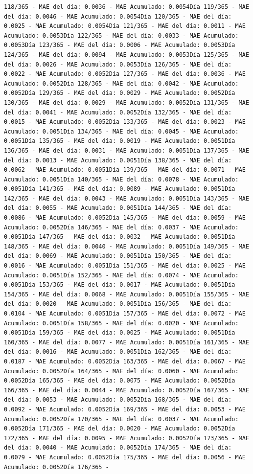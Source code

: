 \documentclass[
]{book}
\begin{document}
\begin{verbatim}
118/365 - MAE del día: 0.0036 - MAE Acumulado: 0.0054Día 119/365 - MAE del día: 0.0046 - MAE Acumulado: 0.0054Día 120/365 - MAE del día: 0.0025 - MAE Acumulado: 0.0054Día 121/365 - MAE del día: 0.0011 - MAE Acumulado: 0.0053Día 122/365 - MAE del día: 0.0033 - MAE Acumulado: 0.0053Día 123/365 - MAE del día: 0.0006 - MAE Acumulado: 0.0053Día 124/365 - MAE del día: 0.0094 - MAE Acumulado: 0.0053Día 125/365 - MAE del día: 0.0026 - MAE Acumulado: 0.0053Día 126/365 - MAE del día: 0.0022 - MAE Acumulado: 0.0052Día 127/365 - MAE del día: 0.0036 - MAE Acumulado: 0.0052Día 128/365 - MAE del día: 0.0042 - MAE Acumulado: 0.0052Día 129/365 - MAE del día: 0.0029 - MAE Acumulado: 0.0052Día 130/365 - MAE del día: 0.0029 - MAE Acumulado: 0.0052Día 131/365 - MAE del día: 0.0041 - MAE Acumulado: 0.0052Día 132/365 - MAE del día: 0.0015 - MAE Acumulado: 0.0052Día 133/365 - MAE del día: 0.0023 - MAE Acumulado: 0.0051Día 134/365 - MAE del día: 0.0045 - MAE Acumulado: 0.0051Día 135/365 - MAE del día: 0.0019 - MAE Acumulado: 0.0051Día 136/365 - MAE del día: 0.0031 - MAE Acumulado: 0.0051Día 137/365 - MAE del día: 0.0013 - MAE Acumulado: 0.0051Día 138/365 - MAE del día: 0.0062 - MAE Acumulado: 0.0051Día 139/365 - MAE del día: 0.0071 - MAE Acumulado: 0.0051Día 140/365 - MAE del día: 0.0078 - MAE Acumulado: 0.0051Día 141/365 - MAE del día: 0.0089 - MAE Acumulado: 0.0051Día 142/365 - MAE del día: 0.0043 - MAE Acumulado: 0.0051Día 143/365 - MAE del día: 0.0055 - MAE Acumulado: 0.0051Día 144/365 - MAE del día: 0.0086 - MAE Acumulado: 0.0052Día 145/365 - MAE del día: 0.0059 - MAE Acumulado: 0.0052Día 146/365 - MAE del día: 0.0037 - MAE Acumulado: 0.0051Día 147/365 - MAE del día: 0.0032 - MAE Acumulado: 0.0051Día 148/365 - MAE del día: 0.0040 - MAE Acumulado: 0.0051Día 149/365 - MAE del día: 0.0069 - MAE Acumulado: 0.0051Día 150/365 - MAE del día: 0.0016 - MAE Acumulado: 0.0051Día 151/365 - MAE del día: 0.0025 - MAE Acumulado: 0.0051Día 152/365 - MAE del día: 0.0074 - MAE Acumulado: 0.0051Día 153/365 - MAE del día: 0.0017 - MAE Acumulado: 0.0051Día 154/365 - MAE del día: 0.0068 - MAE Acumulado: 0.0051Día 155/365 - MAE del día: 0.0020 - MAE Acumulado: 0.0051Día 156/365 - MAE del día: 0.0104 - MAE Acumulado: 0.0051Día 157/365 - MAE del día: 0.0072 - MAE Acumulado: 0.0051Día 158/365 - MAE del día: 0.0020 - MAE Acumulado: 0.0051Día 159/365 - MAE del día: 0.0025 - MAE Acumulado: 0.0051Día 160/365 - MAE del día: 0.0077 - MAE Acumulado: 0.0051Día 161/365 - MAE del día: 0.0016 - MAE Acumulado: 0.0051Día 162/365 - MAE del día: 0.0187 - MAE Acumulado: 0.0052Día 163/365 - MAE del día: 0.0067 - MAE Acumulado: 0.0052Día 164/365 - MAE del día: 0.0060 - MAE Acumulado: 0.0052Día 165/365 - MAE del día: 0.0075 - MAE Acumulado: 0.0052Día 166/365 - MAE del día: 0.0044 - MAE Acumulado: 0.0052Día 167/365 - MAE del día: 0.0053 - MAE Acumulado: 0.0052Día 168/365 - MAE del día: 0.0092 - MAE Acumulado: 0.0052Día 169/365 - MAE del día: 0.0053 - MAE Acumulado: 0.0052Día 170/365 - MAE del día: 0.0037 - MAE Acumulado: 0.0052Día 171/365 - MAE del día: 0.0020 - MAE Acumulado: 0.0052Día 172/365 - MAE del día: 0.0095 - MAE Acumulado: 0.0052Día 173/365 - MAE del día: 0.0040 - MAE Acumulado: 0.0052Día 174/365 - MAE del día: 0.0079 - MAE Acumulado: 0.0052Día 175/365 - MAE del día: 0.0056 - MAE Acumulado: 0.0052Día 176/365 - 
\end{verbatim}
\end{document}
